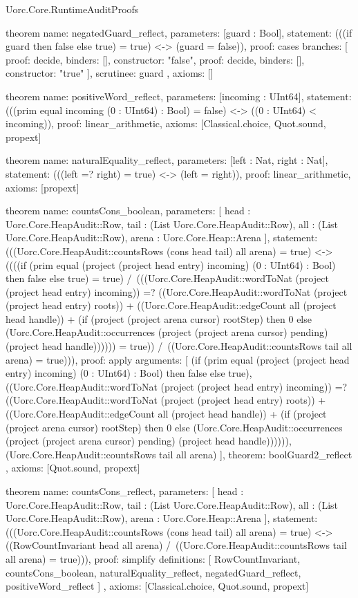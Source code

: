 \begin{lexlean}{Uorc.Core.RuntimeAuditProofs}
\begin{semanticmodule}
theorem{
  name: negatedGuard_reflect,
  parameters: [guard : Bool],
  statement: (((if guard then false else true) = true) <-> (guard = false)),
  proof: cases{
    branches: [
      {proof: decide{}, binders: [], constructor: "false"},
      {proof: decide{}, binders: [], constructor: "true"}
    ],
    scrutinee: guard
  },
  axioms: []
}

theorem{
  name: positiveWord_reflect,
  parameters: [incoming : UInt64],
  statement: (((prim equal incoming (0 : UInt64) : Bool) = false) <-> ((0 : UInt64) < incoming)),
  proof: linear_arithmetic{},
  axioms: [Classical.choice, Quot.sound, propext]
}

theorem{
  name: naturalEquality_reflect,
  parameters: [left : Nat, right : Nat],
  statement: (((left =? right) = true) <-> (left = right)),
  proof: linear_arithmetic{},
  axioms: [propext]
}

theorem{
  name: countsCons_boolean,
  parameters: [
    head : Uorc.Core.HeapAudit::Row,
    tail : (List Uorc.Core.HeapAudit::Row),
    all : (List Uorc.Core.HeapAudit::Row),
    arena : Uorc.Core.Heap::Arena
  ],
  statement: (((Uorc.Core.HeapAudit::countsRows (cons head tail) all arena) = true) <-> ((((if (prim equal (project (project head entry) incoming) (0 : UInt64) : Bool) then false else true) = true) /\ (((Uorc.Core.HeapAudit::wordToNat (project (project head entry) incoming)) =? ((Uorc.Core.HeapAudit::wordToNat (project (project head entry) roots)) + ((Uorc.Core.HeapAudit::edgeCount all (project head handle)) + (if (project (project arena cursor) rootStep) then 0 else (Uorc.Core.HeapAudit::occurrences (project (project arena cursor) pending) (project head handle)))))) = true)) /\ ((Uorc.Core.HeapAudit::countsRows tail all arena) = true))),
  proof: apply{
    arguments: [
      (if (prim equal (project (project head entry) incoming) (0 : UInt64) : Bool) then false else true),
      ((Uorc.Core.HeapAudit::wordToNat (project (project head entry) incoming)) =? ((Uorc.Core.HeapAudit::wordToNat (project (project head entry) roots)) + ((Uorc.Core.HeapAudit::edgeCount all (project head handle)) + (if (project (project arena cursor) rootStep) then 0 else (Uorc.Core.HeapAudit::occurrences (project (project arena cursor) pending) (project head handle)))))),
      (Uorc.Core.HeapAudit::countsRows tail all arena)
    ],
    theorem: boolGuard2_reflect
  },
  axioms: [Quot.sound, propext]
}

theorem{
  name: countsCons_reflect,
  parameters: [
    head : Uorc.Core.HeapAudit::Row,
    tail : (List Uorc.Core.HeapAudit::Row),
    all : (List Uorc.Core.HeapAudit::Row),
    arena : Uorc.Core.Heap::Arena
  ],
  statement: (((Uorc.Core.HeapAudit::countsRows (cons head tail) all arena) = true) <-> ((RowCountInvariant head all arena) /\ ((Uorc.Core.HeapAudit::countsRows tail all arena) = true))),
  proof: simplify{
    definitions: [
      RowCountInvariant,
      countsCons_boolean,
      naturalEquality_reflect,
      negatedGuard_reflect,
      positiveWord_reflect
    ]
  },
  axioms: [Classical.choice, Quot.sound, propext]
}


\end{semanticmodule}
\end{lexlean}
